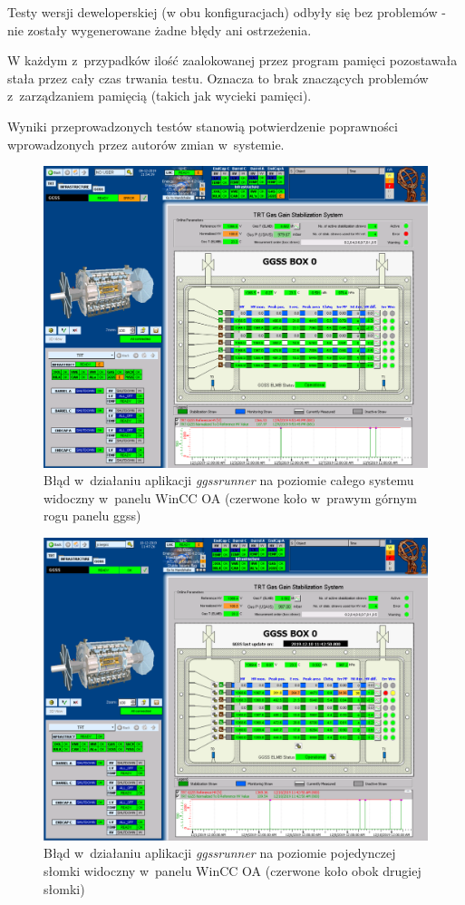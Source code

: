 Testy wersji deweloperskiej (w obu konfiguracjach) odbyły się bez problemów - nie zostały wygenerowane żadne błędy ani ostrzeżenia. 

W każdym z~przypadków ilość zaalokowanej przez program pamięci pozostawała stała przez cały czas trwania testu. Oznacza to brak znaczących problemów z~zarządzaniem pamięcią (takich jak wycieki pamięci).

Wyniki przeprowadzonych testów stanowią potwierdzenie poprawności wprowadzonych przez autorów zmian w~systemie. 

\begin{figure}
\centering
\includegraphics[width=\textwidth]{res/png/ggssError}
\caption{Błąd w~działaniu aplikacji \textit{ggssrunner} na poziomie całego systemu widoczny w~panelu WinCC OA (czerwone koło w~prawym górnym rogu panelu \gls*{ggss})}
\label{fig:ggssErrorScada}
\end{figure}


\begin{figure}
\centering
\includegraphics[width=\textwidth]{res/png/errStraw}
\caption{Błąd w~działaniu aplikacji \textit{ggssrunner} na poziomie pojedynczej słomki widoczny w~panelu WinCC OA (czerwone koło obok drugiej słomki)}
\label{fig:ggssErrorStrawScada}
\end{figure}
